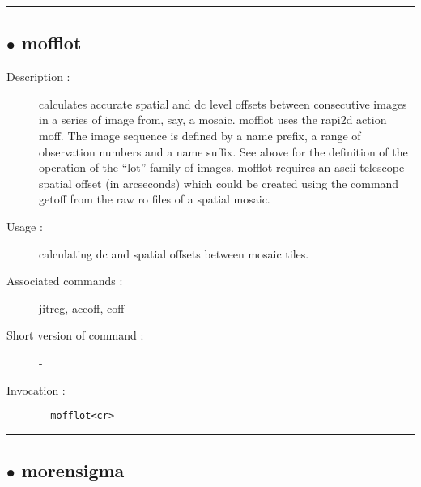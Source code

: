 \hrule \subsection*{$\bullet$ mofflot}
\begin{description}
\item[Description :] calculates accurate spatial and dc level offsets between
consecutive images in a series of image from, say, a mosaic.  mofflot
uses the rapi2d action moff.  The image sequence is defined by a name
prefix, a range of observation numbers and a name suffix.  See above for
the definition of the operation of the ``lot'' family of images.  mofflot
requires an ascii telescope spatial offset (in arcseconds) which could be
created using the command getoff from the raw ro files of a spatial
mosaic.  
\item[Usage :] calculating dc and spatial offsets between mosaic tiles.
\item[Associated commands :] jitreg, accoff, coff
\item[Short version of command :] -
\item[Invocation :]

\verb+  mofflot<cr> +\end{description}

\hrule \subsection*{$\bullet$ morensigma}

